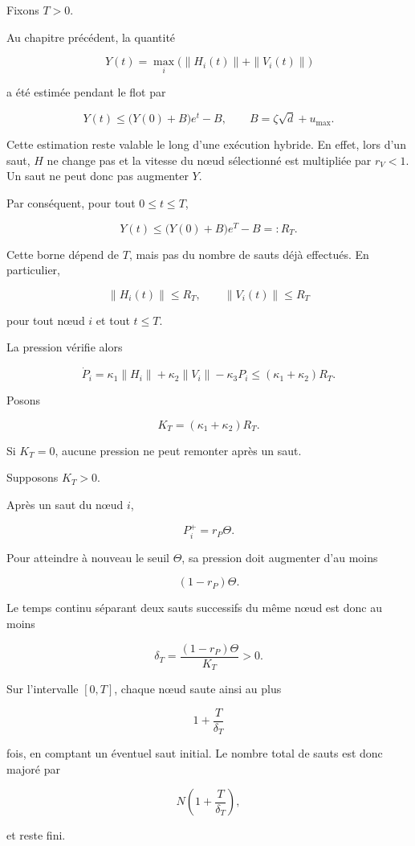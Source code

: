 Fixons \(T>0\).

Au chapitre précédent, la quantité

\[
Y(t)
=
\max_i
\bigl(
\|H_i(t)\|+\|V_i(t)\|
\bigr)
\]

a été estimée pendant le flot par

\[
Y(t)
\leq
\bigl(Y(0)+B\bigr)e^t-B,
\qquad
B=\zeta\sqrt d+u_{\max}.
\]

Cette estimation reste valable le long d'une exécution hybride. En effet, lors d'un saut, \(H\) ne change pas et la vitesse du nœud sélectionné est multipliée par \(r_V<1\). Un saut ne peut donc pas augmenter \(Y\).

Par conséquent, pour tout \(0\leq t\leq T\),

\[
Y(t)
\leq
\bigl(Y(0)+B\bigr)e^T-B
=:R_T.
\]

Cette borne dépend de \(T\), mais pas du nombre de sauts déjà effectués.
En particulier,

\[
\|H_i(t)\|\leq R_T,
\qquad
\|V_i(t)\|\leq R_T
\]

pour tout nœud \(i\) et tout \(t\leq T\).

La pression vérifie alors

\[
\dot P_i
=
\kappa_1\|H_i\|
+
\kappa_2\|V_i\|
-
\kappa_3P_i
\leq
(\kappa_1+\kappa_2)R_T.
\]

Posons

\[
K_T
=
(\kappa_1+\kappa_2)R_T.
\]

Si \(K_T=0\), aucune pression ne peut remonter après un saut.

Supposons \(K_T>0\). 

Après un saut du nœud \(i\),

\[
P_i^+=r_P\Theta.
\]

Pour atteindre à nouveau le seuil \(\Theta\), sa pression doit augmenter d'au moins

\[
(1-r_P)\Theta.
\]

Le temps continu séparant deux sauts successifs du même nœud est donc au moins

\[
\delta_T
=
\frac{(1-r_P)\Theta}{K_T}
>0.
\]

Sur l'intervalle \([0,T]\), chaque nœud saute ainsi au plus

\[
1+\frac{T}{\delta_T}
\]

fois, en comptant un éventuel saut initial. Le nombre total de sauts est donc majoré par

\[
N
\left(
1+\frac{T}{\delta_T}
\right),
\]

et reste fini.

